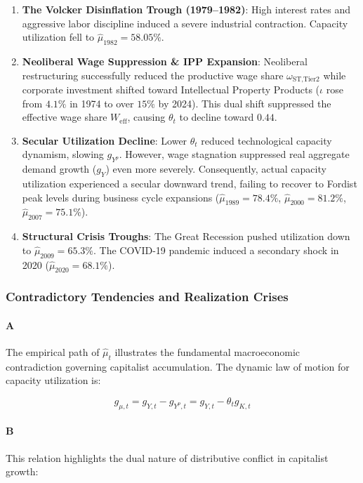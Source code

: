\begin{enumerate}
	\item \textbf{The Volcker Disinflation Trough (1979–1982)}: High interest rates and aggressive labor discipline induced a severe industrial contraction. Capacity utilization fell to $\hat{\mu}_{1982} = 58.05\%$.
	\item \textbf{Neoliberal Wage Suppression \& IPP Expansion}: Neoliberal restructuring successfully reduced the productive wage share $\omega_{\text{ST,Tier2}}$ while corporate investment shifted toward Intellectual Property Products ($\iota$ rose from $4.1\%$ in 1974 to over $15\%$ by 2024). This dual shift suppressed the effective wage share $W_{\text{eff}}$, causing $\theta_t$ to decline toward $0.44$.
	\item \textbf{Secular Utilization Decline}: Lower $\theta_t$ reduced technological capacity dynamism, slowing $g_{Y^p}$. However, wage stagnation suppressed real aggregate demand growth ($g_Y$) even more severely. Consequently, actual capacity utilization experienced a secular downward trend, failing to recover to Fordist peak levels during business cycle expansions ($\hat{\mu}_{1989} = 78.4\%$, $\hat{\mu}_{2000} = 81.2\%$, $\hat{\mu}_{2007} = 75.1\%$).
	\item \textbf{Structural Crisis Troughs}: The Great Recession pushed utilization down to $\hat{\mu}_{2009} = 65.3\%$. The COVID-19 pandemic induced a secondary shock in 2020 ($\hat{\mu}_{2020} = 68.1\%$).
\end{enumerate}

\subsubsection{Contradictory Tendencies and Realization Crises}

\paragraph{A}
The empirical path of $\hat{\mu}_t$ illustrates the fundamental macroeconomic contradiction governing capitalist accumulation. The dynamic law of motion for capacity utilization is:

\[g_{\mu,t} = g_{Y,t} - g_{Y^p,t} = g_{Y,t} - \theta_t g_{K,t}\]

\paragraph{B}
This relation highlights the dual nature of distributive conflict in capitalist growth:

